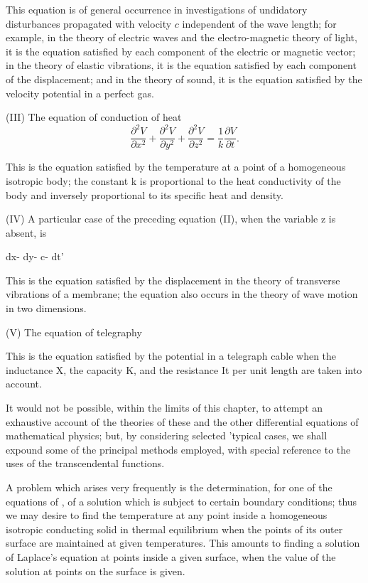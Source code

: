 This equation is of general occurrence in
investigations of undidatory disturbances propagated with velocity
$c$ independent of the wave length; for example, in the theory of
electric waves and the electro-magnetic theory of light, it is the
equation satisfied by each component of the electric or magnetic
vector; in the theory of elastic vibrations, it is the equation
satisfied by each component of the displacement; and in the theory
of sound, it is the equation satisfied by the velocity potential
in a perfect gas.

%
%

(III) The equation of conduction of heat
$$
\frac{\partial^{2} V}{\partial x^{2}} +
\frac{\partial^{2} V}{\partial y^{2}} +
\frac{\partial^{2} V}{\partial z^{2}} =
\frac{1}{k} \frac{\partial V}{\partial t}.
$$

This is the equation satisfied by the temperature at a point of a
homogeneous isotropic body; the constant k is proportional to the
heat conductivity of the body and inversely proportional to its
specific heat and density.

(IV) A particular case of the preceding equation (II), when the
variable z is absent, is

dx- dy- c- dt'

This is the equation satisfied by the displacement in the theory of
transverse vibrations of a membrane; the equation also occurs in the
theory of wave motion in two dimensions.

(V) The equation of telegraphy

This is the equation satisfied by the potential in a telegraph cable
when the inductance X, the capacity K, and the resistance It per unit
length are taken into account.

It would not be possible, within the limits of this chapter, to
attempt an exhaustive account of the theories of these and the other
differential equations of mathematical physics; but, by considering
selected 'typical cases, we shall expound some of the principal
methods employed, with special reference to the uses of the
transcendental functions.


A problem which arises very frequently is the determination, for one
of the equations of , of a solution which is subject to certain
boundary conditions; thus we may desire to find the temperature at
any point inside a homogeneous isotropic conducting solid in thermal
equilibrium when the points of its outer surface are maintained at
given temperatures. This amounts to finding a solution of Laplace's
equation at points inside a given surface, when the value of the
solution at points on the surface is given.

